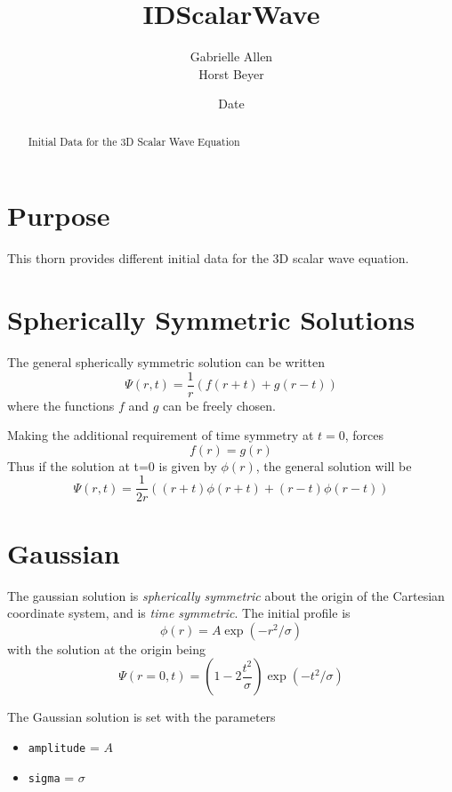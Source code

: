 \documentclass{article}
\begin{document}
\title{IDScalarWave}
\author{Gabrielle Allen \\ Horst Beyer}
\date{$ $Date$ $}

\maketitle


\begin{abstract}
Initial Data for the 3D Scalar Wave Equation
\end{abstract}

\section{Purpose}

This thorn provides different initial data for the 3D scalar wave
equation. 

\section{Spherically Symmetric Solutions}

The general spherically symmetric solution can be written
\begin{equation}
\Psi(r,t) = \frac{1}{r}\left(f(r+t)+g(r-t)\right)
\end{equation}
where the functions $f$ and $g$ can be freely chosen. 

Making the additional requirement of time symmetry at $t=0$, forces
\begin{equation}
f(r)=g(r)
\end{equation}
Thus if the solution at t=0 is given by $\phi(r)$, the general solution
will be
\begin{equation}
\Psi(r,t) = \frac{1}{2r}\left( (r+t)\phi(r+t)+(r-t)\phi(r-t) \right)
\end{equation}

\section{Gaussian}

The gaussian solution is {\it spherically symmetric} about the 
origin of the Cartesian coordinate system, and is {\it time symmetric}.
The initial profile is
\begin{equation}
\phi(r) = A \exp (- r^2/\sigma)
\end{equation}
with the solution at the origin being
\begin{equation}
\Psi(r=0,t) = \left(1-2\frac{t^2}{\sigma}\right)\exp(-t^2/\sigma)
\end{equation}

The Gaussian solution is set with the parameters
\begin{itemize}

\item {\tt amplitude} = $A$

\item {\tt sigma} = $\sigma$

\end{itemize}


\end{document}
